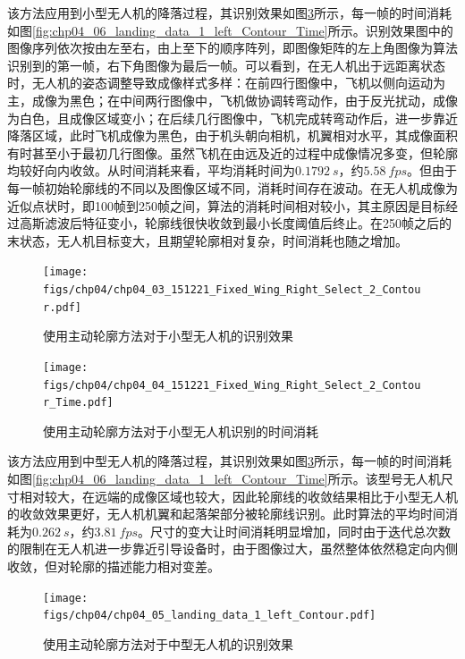 该方法应用到小型无人机的降落过程，其识别效果如图\ref{fig:chp04_05_landing_data_1_left_Contour}所示，每一帧的时间消耗如图\ref{fig:chp04_06_landing_data_1_left_Contour_Time}所示。识别效果图中的图像序列依次按由左至右，由上至下的顺序阵列，即图像矩阵的左上角图像为算法识别到的第一帧，右下角图像为最后一帧。可以看到，在无人机出于远距离状态时，无人机的姿态调整导致成像样式多样：在前四行图像中，飞机以侧向运动为主，成像为黑色；在中间两行图像中，飞机做协调转弯动作，由于反光扰动，成像为白色，且成像区域变小；在后续几行图像中，飞机完成转弯动作后，进一步靠近降落区域，此时飞机成像为黑色，由于机头朝向相机，机翼相对水平，其成像面积有时甚至小于最初几行图像。虽然飞机在由远及近的过程中成像情况多变，但轮廓均较好向内收敛。从时间消耗来看，平均消耗时间为$0.1792\ s$，约$5.58\ fps$。但由于每一帧初始轮廓线的不同以及图像区域不同，消耗时间存在波动。在无人机成像为近似点状时，即100帧到250帧之间，算法的消耗时间相对较小，其主原因是目标经过高斯滤波后特征变小，轮廓线很快收敛到最小长度阈值后终止。在250帧之后的末状态，无人机目标变大，且期望轮廓相对复杂，时间消耗也随之增加。

\begin{figure}[ht]   
	\centering
	\texttt{[image: figs/chp04/chp04\_03\_151221\_Fixed\_Wing\_Right\_Select\_2\_Contour.pdf]}
	\caption{使用主动轮廓方法对于小型无人机的识别效果}
	\label{fig:chp04_03_151221_Fixed_Wing_Right_Select_2_Contour}
\end{figure}

\begin{figure}[ht]   
	\centering
	\texttt{[image: figs/chp04/chp04\_04\_151221\_Fixed\_Wing\_Right\_Select\_2\_Contour\_Time.pdf]}
	\caption{使用主动轮廓方法对于小型无人机识别的时间消耗}
	\label{fig:chp04_04_151221_Fixed_Wing_Right_Select_2_Contour_Time}
\end{figure}

该方法应用到中型无人机的降落过程，其识别效果如图\ref{fig:chp04_05_landing_data_1_left_Contour}所示，每一帧的时间消耗如图\ref{fig:chp04_06_landing_data_1_left_Contour_Time}所示。该型号无人机尺寸相对较大，在远端的成像区域也较大，因此轮廓线的收敛结果相比于小型无人机的收敛效果更好，无人机机翼和起落架部分被轮廓线识别。此时算法的平均时间消耗为$0.262\ s$，约$3.81\ fps$。尺寸的变大让时间消耗明显增加，同时由于迭代总次数的限制在无人机进一步靠近引导设备时，由于图像过大，虽然整体依然稳定向内侧收敛，但对轮廓的描述能力相对变差。
\begin{figure}[ht]   
	\centering
	\texttt{[image: figs/chp04/chp04\_05\_landing\_data\_1\_left\_Contour.pdf]}
	\caption{使用主动轮廓方法对于中型无人机的识别效果}
	\label{fig:chp04_05_landing_data_1_left_Contour}
\end{figure}

